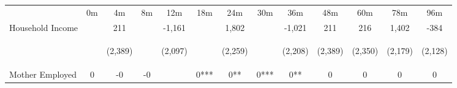 \begin{tabular}{lcccccccccccc}
\hline \noalign{\smallskip} & 0m & 4m & 8m & 12m & 18m & 24m & 30m & 36m & 48m & 60m & 78m & 96m\\
\noalign{\smallskip}\hline \noalign{\smallskip}Household Income &  & 211 &  & -1,161 &  & 1,802 &  & -1,021 & 211 & 216 & 1,402 & -384\\
 & \begin{footnotesize}\end{footnotesize} & \begin{footnotesize}(2,389)\end{footnotesize} & \begin{footnotesize}\end{footnotesize} & \begin{footnotesize}(2,097)\end{footnotesize} & \begin{footnotesize}\end{footnotesize} & \begin{footnotesize}(2,259)\end{footnotesize} & \begin{footnotesize}\end{footnotesize} & \begin{footnotesize}(2,208)\end{footnotesize} & \begin{footnotesize}(2,389)\end{footnotesize} & \begin{footnotesize}(2,350)\end{footnotesize} & \begin{footnotesize}(2,179)\end{footnotesize} & \begin{footnotesize}(2,128)\end{footnotesize}\\
\noalign{\smallskip}Mother Employed & 0 & -0 & -0 &  & 0*** & 0** & 0*** & 0** & 0 & 0 & 0 & 0\\

\end{tabular}
